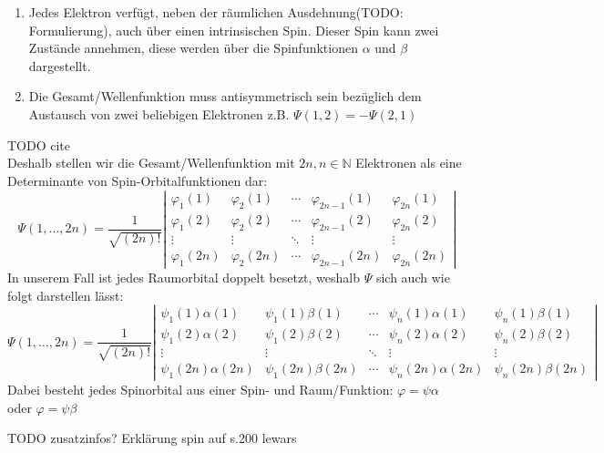 \begin{enumerate}
  \item Jedes Elektron verfügt, neben der räumlichen Ausdehnung(TODO: Formulierung), 
  auch über einen intrinsischen Spin. Dieser Spin kann zwei Zustände annehmen, diese werden über
  die Spinfunktionen $\alpha$ und $\beta$ dargestellt.
  \item Die Gesamt\-/Wellenfunktion muss antisymmetrisch sein 
  bezüglich dem Austausch von zwei beliebigen Elektronen z.B.
  $\Psi(1, 2) = - \Psi(2, 1)$
\end{enumerate}
TODO cite\\
Deshalb stellen wir die Gesamt\-/Wellenfunktion mit 
$2n, n \in \mathbb{N}$ Elektronen als eine Determinante von Spin-Orbitalfunktionen dar:
\begin{equation}\label{slater}
\Psi(1, \dots, 2n) = 
\frac{1}{\sqrt{(2n)!}}
\left\lvert
\begin{array}{ccccc} 
\varphi_1(1)  & \varphi_2(1)  & \cdots & \varphi_{2n-1}(1)  & \varphi_{2n}(1)\\ 
\varphi_1(2)  & \varphi_2(2)  & \cdots & \varphi_{2n-1}(2)  & \varphi_{2n}(2)\\ 
\vdots        & \vdots        & \ddots & \vdots             & \vdots      \\ 
\varphi_1(2n) & \varphi_2(2n) & \cdots & \varphi_{2n-1}(2n) & \varphi_{2n}(2n)
\end{array}
\right\rvert
\end{equation}
In unserem Fall ist jedes Raumorbital doppelt besetzt, weshalb $\Psi$ sich auch wie folgt darstellen lässt:
\begin{equation}
\Psi(1, \dots, 2n) = 
\frac{1}{\sqrt{(2n)!}}
\left\lvert
\begin{array}{ccccc} 
\psi_1(1)\alpha(1) & \psi_1(1)\beta(1) & \cdots & \psi_n(1)\alpha(1) & \psi_n(1)\beta(1)\\ 
\psi_1(2)\alpha(2) & \psi_1(2)\beta(2) & \cdots & \psi_n(2)\alpha(2) & \psi_n(2)\beta(2)\\ 
    \vdots         &       \vdots      & \ddots &       \vdots       &       \vdots     \\ 
\psi_1(2n)\alpha(2n) & \psi_1(2n)\beta(2n) & \cdots & \psi_n(2n)\alpha(2n) & \psi_n(2n) \beta(2n)
\end{array}
\right\rvert
\end{equation}
Dabei besteht jedes Spinorbital aus einer Spin- und Raum\-/Funktion: $\varphi = \psi \alpha$ oder $\varphi = \psi \beta$

TODO zusatzinfos? Erklärung spin auf s.200 lewars
